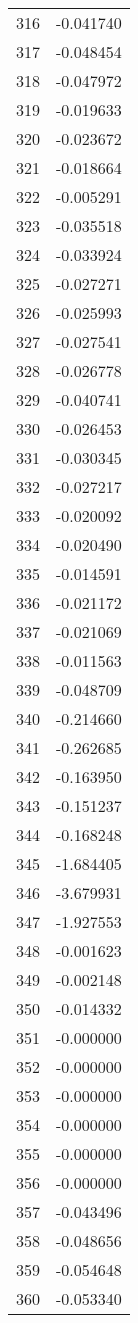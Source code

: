 \documentclass[12pt]{article}
\begin{document}
\begin{longtable}{@{}cc@{}}
316 & -0.041740 \\
317 & -0.048454 \\
318 & -0.047972 \\
319 & -0.019633 \\
320 & -0.023672 \\
321 & -0.018664 \\
322 & -0.005291 \\
323 & -0.035518 \\
324 & -0.033924 \\
325 & -0.027271 \\
326 & -0.025993 \\
327 & -0.027541 \\
328 & -0.026778 \\
329 & -0.040741 \\
330 & -0.026453 \\
331 & -0.030345 \\
332 & -0.027217 \\
333 & -0.020092 \\
334 & -0.020490 \\
335 & -0.014591 \\
336 & -0.021172 \\
337 & -0.021069 \\
338 & -0.011563 \\
339 & -0.048709 \\
340 & -0.214660 \\
341 & -0.262685 \\
342 & -0.163950 \\
343 & -0.151237 \\
344 & -0.168248 \\
345 & -1.684405 \\
346 & -3.679931 \\
347 & -1.927553 \\
348 & -0.001623 \\
349 & -0.002148 \\
350 & -0.014332 \\
351 & -0.000000 \\
352 & -0.000000 \\
353 & -0.000000 \\
354 & -0.000000 \\
355 & -0.000000 \\
356 & -0.000000 \\
357 & -0.043496 \\
358 & -0.048656 \\
359 & -0.054648 \\
360 & -0.053340 \\

\end{longtable}
\end{document}
